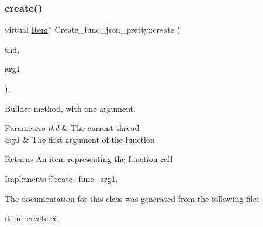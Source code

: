 \subsubsection{\texorpdfstring{create()}{create()}}
{\footnotesize\ttfamily virtual \mbox{\hyperlink{classItem}{Item}}$\ast$ Create\+\_\+func\+\_\+json\+\_\+pretty\+::create (\begin{DoxyParamCaption}\item[{T\+HD $\ast$}]{thd,  }\item[{\mbox{\hyperlink{classItem}{Item}} $\ast$}]{arg1 }\end{DoxyParamCaption})\hspace{0.3cm}{\ttfamily [inline]}, {\ttfamily [virtual]}}

Builder method, with one argument. 
\begin{DoxyParams}{Parameters}
{\em thd} & The current thread \\
\hline
{\em arg1} & The first argument of the function \\
\hline
\end{DoxyParams}
\begin{DoxyReturn}{Returns}
An item representing the function call 
\end{DoxyReturn}


Implements \mbox{\hyperlink{classCreate__func__arg1_a3e9a98f755cd82c3e762e334c955a8c9}{Create\+\_\+func\+\_\+arg1}}.



The documentation for this class was generated from the following file\+:\begin{DoxyCompactItemize}
\item 
\mbox{\hyperlink{item__create_8cc}{item\+\_\+create.\+cc}}\end{DoxyCompactItemize}
